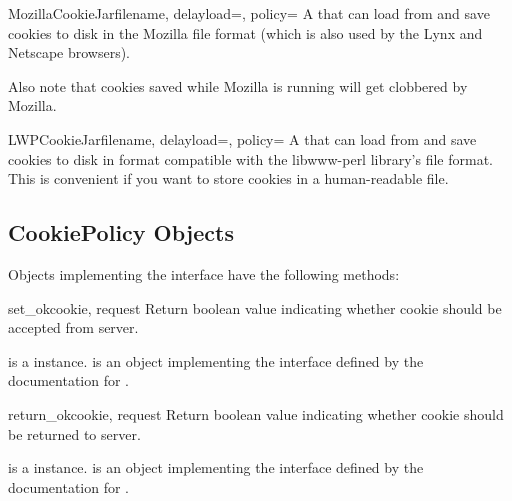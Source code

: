 \begin{classdesc}{MozillaCookieJar}{filename, delayload=,
 policy=}
A  that can load from and save cookies to disk in
the Mozilla  file format (which is also used by the
Lynx and Netscape browsers).  


Also note that cookies saved while Mozilla is running will get
clobbered by Mozilla.
\end{classdesc}

\begin{classdesc}{LWPCookieJar}{filename, delayload=,
 policy=}
A  that can load from and save cookies to disk in
format compatible with the libwww-perl library's 
file format.  This is convenient if you want to store cookies in a
human-readable file.
\end{classdesc}


\subsection{CookiePolicy Objects \label{cookie-policy-objects}}

Objects implementing the  interface have the
following methods:

\begin{methoddesc}[CookiePolicy]{set_ok}{cookie, request}
Return boolean value indicating whether cookie should be accepted from server.

 is a  instance.   is
an object implementing the interface defined by the documentation for
.
\end{methoddesc}

\begin{methoddesc}[CookiePolicy]{return_ok}{cookie, request}
Return boolean value indicating whether cookie should be returned to server.

 is a  instance.   is
an object implementing the interface defined by the documentation for
.
\end{methoddesc}

